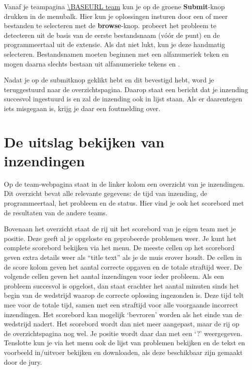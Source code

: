 Vanaf je teampagina \url{\BASEURL team} kun je op de groene \textbf{Submit}-knop
drukken in de menubalk. Hier kun je oplossingen insturen
door een of meer bestanden te selecteren met de \textbf{browse}-knop.
\DOMjudge probeert het probleem te detecteren uit de
basis van de eerste bestandsnaam (v\'o\'or de punt) en de programmeertaal uit
de extensie. Als dat niet lukt, kun je deze handmatig selecteren.
Bestandsnamen moeten beginnen met een alfanumeriek teken en
mogen daarna slechts bestaan uit alfanumerieke tekens en
.

Nadat je op de submitknop geklikt hebt en dit bevestigd hebt, word je
teruggestuurd naar de overzichtspagina. Daarop staat een
bericht dat je inzending succesvol ingestuurd is en zal de inzending
ook in lijst staan. Als er daarentegen iets misgegaan is, krijg je
daar een foutmelding over.

\section{De uitslag bekijken van inzendingen}

Op de team-webpagina staat in de linker kolom een overzicht van je inzendingen.
Dit overzicht bevat alle relevante gegevens: de tijd van inzending, de
programmeertaal, het probleem en de status. Hier vind je ook het scorebord
met de resultaten van de andere teams.

Bovenaan het overzicht staat de rij uit het scorebord van je eigen
team met je positie. Deze geeft al je opgeloste en geprobeerde
problemen weer. Je kunt het complete scorebord bekijken via het menu.
De meeste cellen op het scorebord geven extra details weer als ``title
text'' als je de muis erover houdt. De cellen in de score kolom geven
het aantal correcte opgaven en de totale straftijd weer. De volgende
cellen geven het aantal inzendingen voor ieder probleem. Als een
probleem succesvol is opgelost, dan staat erachter het aantal minuten
sinds het begin van de wedstrijd waarop de correcte oplossing
ingezonden is. Deze tijd telt mee voor de totale tijd, samen met een
straftijd voor alle voorgaande incorrect inzendingen.
Het scorebord kan mogelijk `bevroren' worden als het einde van de
wedstrijd nadert. Het scorebord wordt dan niet meer aangepast, maar de
rij op de overzichtspagina nog wel. Je positie wordt daar dan met een
`?' weergegeven. Tenslotte kun je via het menu ook de lijst van
problemen bekijken en de tekst en voorbeeld in/uitvoer bekijken en
downloaden, als deze beschikbaar zijn gemaakt door de jury.

